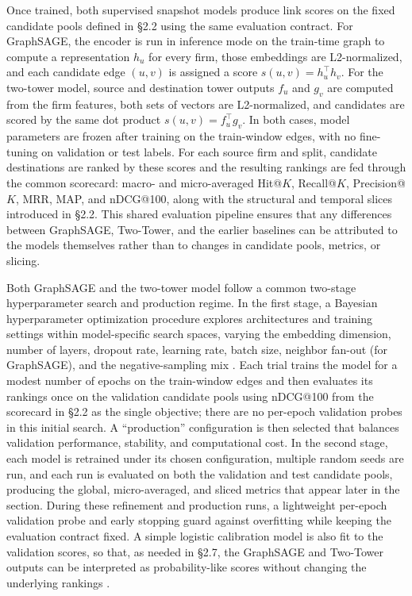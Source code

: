 Once trained, both supervised snapshot models produce link scores on the fixed candidate pools defined in \S2.2 using the same evaluation contract. For GraphSAGE, the encoder is run in inference mode on the train-time graph to compute a representation \(h_u\) for every firm, those embeddings are L2-normalized, and each candidate edge \((u,v)\) is assigned a score \(s(u,v) = h_u^\top h_v\). For the two-tower model, source and destination tower outputs \(f_u\) and \(g_v\) are computed from the firm features, both sets of vectors are L2-normalized, and candidates are scored by the same dot product \(s(u,v) = f_u^\top g_v\). In both cases, model parameters are frozen after training on the train-window edges, with no fine-tuning on validation or test labels. For each source firm and split, candidate destinations are ranked by these scores and the resulting rankings are fed through the common scorecard: macro- and micro-averaged Hit@\(K\), Recall@\(K\), Precision@\(K\), MRR, MAP, and nDCG@100, along with the structural and temporal slices introduced in \S2.2. This shared evaluation pipeline ensures that any differences between GraphSAGE, Two-Tower, and the earlier baselines can be attributed to the models themselves rather than to changes in candidate pools, metrics, or slicing.

Both GraphSAGE and the two-tower model follow a common two-stage hyperparameter search and production regime. In the first stage, a Bayesian hyperparameter optimization procedure explores architectures and training settings within model-specific search spaces, varying the embedding dimension, number of layers, dropout rate, learning rate, batch size, neighbor fan-out (for GraphSAGE), and the negative-sampling mix \parencite{bergstra_algorithms_2011,bergstra_random_2012,akiba_optuna_2019}. Each trial trains the model for a modest number of epochs on the train-window edges and then evaluates its rankings once on the validation candidate pools using nDCG@100 from the scorecard in \S2.2 as the single objective; there are no per-epoch validation probes in this initial search. A ``production'' configuration is then selected that balances validation performance, stability, and computational cost. In the second stage, each model is retrained under its chosen configuration, multiple random seeds are run, and each run is evaluated on both the validation and test candidate pools, producing the global, micro-averaged, and sliced metrics that appear later in the section. During these refinement and production runs, a lightweight per-epoch validation probe and early stopping guard against overfitting while keeping the evaluation contract fixed. A simple logistic calibration model is also fit to the validation scores, so that, as needed in \S2.7, the GraphSAGE and Two-Tower outputs can be interpreted as probability-like scores without changing the underlying rankings \parencite{goodfellow_deep_2016}.

